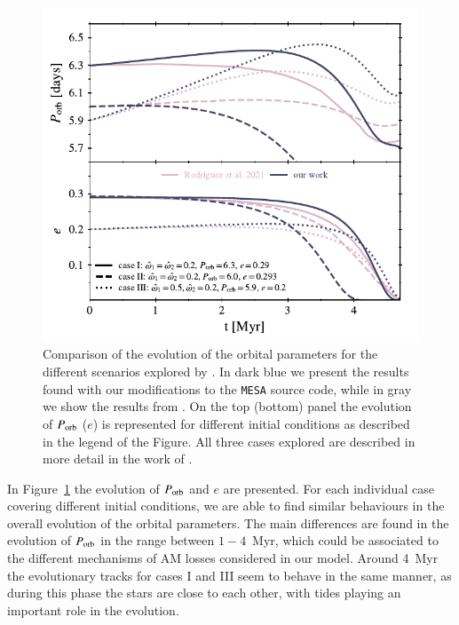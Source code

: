\documentclass{aa}
\begin{document}
\begin{figure}
    \centering
    \includegraphics[width=\hsize]{figures/rodriguez_fig14.pdf}
    \caption{Comparison of the evolution of the orbital parameters for the different scenarios explored by \citet{rodriguez2021}. In dark
       blue we present the results found with our modifications to the {\tt MESA} source code, while in gray we show the results from
       \citet{rodriguez2021}. On the top (bottom) panel the evolution of $P_{\rm orb}$ ($e$) is represented for different initial
       conditions as described in the legend of the Figure. All three cases explored are described in more detail in the work of 
       \citet{rodriguez2021}.}
    \label{fig:rodriguez_comparison}
\end{figure}

In Figure~\ref{fig:rodriguez_comparison} the evolution of $P_{\rm orb}$ and $e$ are presented. For each individual case covering different
initial conditions, we are able to find similar behaviours in the overall evolution of the orbital parameters. The main differences are
found in the evolution of $P_{\rm orb}$ in the range between $1-4$~Myr, which could be associated to the different mechanisms of AM losses
considered in our model. Around 4~Myr the evolutionary tracks for cases I and III seem to behave in the same manner, as during this phase
the stars are close to each other, with tides playing an important role in the evolution.
\end{document}
